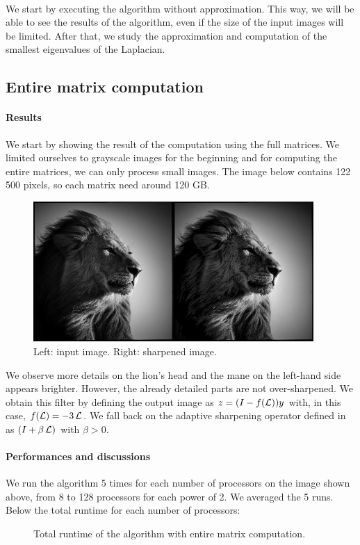 \paragraph{}
We start by executing the algorithm without approximation.
This way, we will be able to see the results of the algorithm, even if the size of the input images will be limited.
After that, we study the approximation and computation of the smallest eigenvalues of the Laplacian.

\subsection{Entire matrix computation}

\paragraph{Results}
We start by showing the result of the computation using the full matrices.
We limited ourselves to grayscale images for the beginning and for computing the entire matrices, we can only process small images.
The image below contains 122 500 pixels, so each matrix need around 120 GB.

\begin{figure}[H]
  \centering
  \includegraphics[width=0.95\textwidth]{img/lion.png}
  \caption{Left: input image. Right: sharpened image.}
\end{figure}

We observe more details on the lion's head and the mane on the left-hand side appears brighter.
However, the already detailed parts are not over-sharpened.
We obtain this filter by defining the output image as \(z = (I - f(\operatorname{\mathcal{L}}))y\) with, in this case, \(f(\operatorname{\mathcal{L}}) = -3\operatorname{\mathcal{L}}\).
We fall back on the adaptive sharpening operator defined in \cite{siam_slides_2016} as \((I + \beta \operatorname{\mathcal{L}})\) with \(\beta > 0\).

\paragraph{Performances and discussions}
We run the algorithm 5 times for each number of processors on the image shown above, from 8 to 128 processors for each power of 2.
We averaged the 5 runs.
Below the total runtime for each number of processors:
\begin{figure}[H]
  \centering
  
  \caption{Total runtime of the algorithm with entire matrix computation.}
\end{figure}

